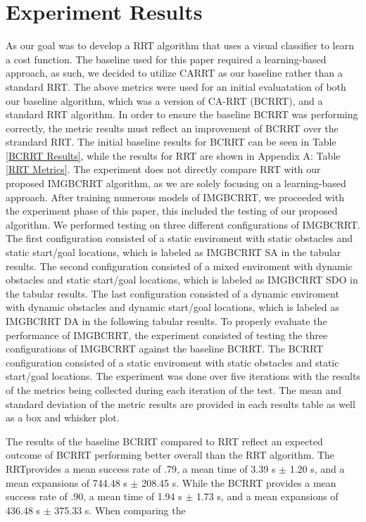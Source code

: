 \documentclass{article}
\begin{document}
\section{Experiment Results}
As our goal was to develop a RRT algorithm that uses a visual classifier to learn a cost function. The baseline used for this paper required a learning-based approach, as such, we decided to utilize CARRT as our baseline rather than a standard RRT. The above metrics were used for an initial evaluatation of both our baseline algorithm, which was a version of CA-RRT (BCRRT), and a standard RRT algorithm. In order to ensure the baseline BCRRT was performing correctly, the metric results must reflect an improvement of BCRRT over the strandard RRT. The initial baseline results for BCRRT can be seen in Table \ref{BCRRT Results}, while the results for RRT are shown in Appendix A: Table \ref{RRT Metrics}. The experiment does not directly compare RRT with our proposed IMGBCRRT algorithm, as we are solely focusing on a learning-based approach. After training numerous models of IMGBCRRT, we proceeded with the experiment phase of this paper, this included the testing of our proposed algorithm. We performed testing on three different configurations of IMGBCRRT. The first configuration consisted of a static enviroment with static obstacles and static start/goal locations, which is labeled as IMGBCRRT SA in the tabular results. The second configuration consisted of a mixed enviroment with dynamic obstacles and static start/goal locations, which is labeled as IMGBCRRT SDO in the tabular results. The last configuration consisted of a dynamic enviroment with dynamic obstacles and dynamic start/goal locations, which is labeled as IMGBCRRT DA in the following tabular results. To properly evaluate the performance of IMGBCRRT, the experiment consisted of testing the three configurations of IMGBCRRT against the baseline BCRRT. The BCRRT configuration consisted of a static enviroment with static obstacles and static start/goal locations. The experiment was done over five iterations with the results of the metrics being collected during each iteration of the test. The mean and standard deviation of the metric results are provided in each results table as well as a box and whisker plot. 

The results of the baseline BCRRT compared to RRT reflect an expected outcome of  BCRRT performing better overall than the RRT algorithm. The RRTprovides a mean success rate of .79, a mean time of 3.39 s $\pm$ 1.20 s, and a mean expansions of 744.48 s $\pm$ 208.45 s. While the BCRRT provides a mean success rate of .90, a mean time of 1.94 s $\pm$ 1.73 s, and a mean expansions of 436.48 s $\pm$ 375.33 s. When comparing the %
\end{document}
